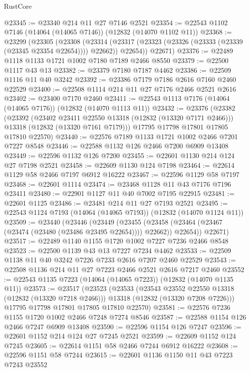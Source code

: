 \begin{lexlean}{RustCore}
\begin{coremodule}
@23345 := @23340 @214 @11 @27 @7146 @2521
@23354 := @22543 @1102 @7146 (@14064 (@14065 @7146)) (@12832 (@14070 @1102 @11))
@23368 := @23299
    (@23305
      (@23308
        (@23314 (@23317 (@23323 (@23326 (@23333 (@23339 (@23345 @23354 @22654)))) @22662)) @22654))
      @22671)
@23376 := @22489 @1118 @1133 @1721 @1002 @7180 @7189 @2466 @8550
@23379 := @22500 @1117 @43 @13
@23382 := @23379 @7180 @7187 @4462
@23386 := @22509 @1116 @11 @40 @3242
@23392 := @23386 @7179 @7186 @2616 @7160 @2460 @22529
@23400 := @22508 @1114 @214 @11 @27 @7176 @2466 @2521 @2616
@23402 := @23400 @7170 @2460
@23411 := @22543 @1113 @7176 (@14064 (@14065 @7176)) (@12832 (@14070 @1113 @11))
@23432 := @23376
    (@23382
      (@23392
        (@23402 @23411 @22550 @13318 (@12832 (@13320 @7171 @2466)))
        @13318
        (@12832 (@13320 @7161 @7179)))
      @17795
      @17798
      @17801
      @17805
      @17810
      @22570)
@23440 := @22576 @7189 @1133 @1721 @1002 @2466 @7201 @7227 @8548
@23446 := @22588 @1132 @126 @2466 @7200 @6909 @13408
@23449 := @22596 @1132 @126 @7200
@23455 := @22601 @1130 @214 @124 @27 @7198 @2521
@23458 := @22609 @1130 @124 @7198
@23464 := @22614 @1129 @58 @2466 @7197 @6912 @16222
@23467 := @22596 @1129 @58 @7197
@23468 := @22601 @1114
@23474 := @23468 @1128 @11 @43 @7176 @7196 @23411
@23480 := @22901 @1127 @11 @40 @7002 @7195 @22915
@23481 := @22601 @1125
@23486 := @23481 @214 @11 @27 @7193 @2521
@23495 := @22543 @1124 @7193 (@14064 (@14065 @7193)) (@12832 (@14070 @1124 @11))
@23509 := @23440
    (@23446
      (@23449
        (@23455 (@23458 (@23464 (@23467 (@23474 (@23480 (@23486 @23495 @22654)))) @22662)) @22654))
      @22671)
@23517 := @22489 @1140 @1155 @1720 @1002 @7227 @7236 @2466 @8548
@23523 := @22500 @1139 @43 @13 @7227 @7234 @4462
@23533 := @22509 @1138 @11 @40 @3242 @7226 @7233 @2616 @7207 @2460 @22529
@23543 := @22508 @1136 @214 @11 @27 @7223 @2466 @2521 @2616 @7217 @2460
@23552 := @22543 @1135 @7223 (@14064 (@14065 @7223)) (@12832 (@14070 @1135 @11))
@23573 := @23517
    (@23523
      (@23533
        (@23543 @23552 @22550 @13318 (@12832 (@13320 @7218 @2466)))
        @13318
        (@12832 (@13320 @7208 @7226)))
      @17795
      @17798
      @17801
      @17805
      @17810
      @22570)
@23581 := @22576 @7236 @1155 @1720 @1002 @2466 @7248 @7274 @8546
@23587 := @22588 @1154 @126 @2466 @7247 @6909 @13408
@23590 := @22596 @1154 @126 @7247
@23596 := @22601 @1152 @214 @124 @27 @7245 @2521
@23599 := @22609 @1152 @124 @7245
@23605 := @22614 @1151 @58 @2466 @7244 @6912 @16222
@23608 := @22596 @1151 @58 @7244
@23615 := @22601 @1136 @1150 @11 @43 @7223 @7243 @23552

\end{coremodule}
\end{lexlean}
